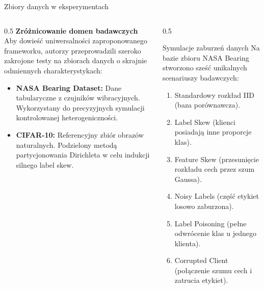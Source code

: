 \documentclass[9pt,aspectratio=169]{beamer}
\begin{document}
\begin{frame}{Zbiory danych w eksperymentach}
\begin{columns}[T]
\begin{column}{0.5\textwidth}
\textbf{Zróżnicowanie domen badawczych}\\[4pt]
Aby dowieść uniwersalności zaproponowanego frameworku, autorzy przeprowadzili szeroko zakrojone testy na zbiorach danych o skrajnie odmiennych charakterystykach:
\begin{itemize}\footnotesize
\item \textbf{NASA Bearing Dataset:} Dane tabularyczne z czujników wibracyjnych. Wykorzystany do precyzyjnych symulacji kontrolowanej heterogeniczności.
\item \textbf{CIFAR-10:} Referencyjny zbiór obrazów naturalnych. Podzielony metodą partycjonowania Dirichleta w celu indukcji silnego label skew.
\end{itemize}
\end{column}
\begin{column}{0.5\textwidth}
\begin{infoboxgreen}{Symulacje zaburzeń danych}
Na bazie zbioru NASA Bearing stworzono sześć unikalnych scenariuszy badawczych:
\begin{enumerate}\footnotesize
\item Standardowy rozkład IID (baza porównawcza).
\item Label Skew (klienci posiadają inne proporcje klas).
\item Feature Skew (przesunięcie rozkładu cech przez szum Gaussa).
\item Noisy Labels (część etykiet losowo zaburzona).
\item Label Poisoning (pełne odwrócenie klas u jednego klienta).
\item Corrupted Client (połączenie szumu cech i zatrucia etykiet).
\end{enumerate}
\end{infoboxgreen}
\end{column}
\end{columns}
\end{frame}
\end{document}
